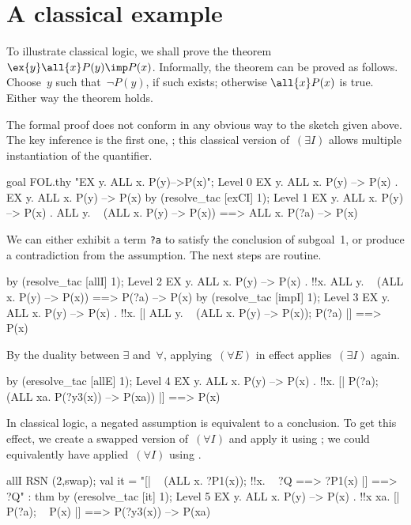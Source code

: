 \section{A classical example} \label{fol-cla-example}
To illustrate classical logic, we shall prove the theorem
$\ex{y}\all{x}P(y)\imp P(x)$.  Informally, the theorem can be proved as
follows.  Choose~$y$ such that~$\neg P(y)$, if such exists; otherwise
$\all{x}P(x)$ is true.  Either way the theorem holds.

The formal proof does not conform in any obvious way to the sketch given
above.  The key inference is the first one, ; this classical
version of~$(\exists I)$ allows multiple instantiation of the quantifier.
\begin{ttbox}
goal FOL.thy "EX y. ALL x. P(y)-->P(x)";
{\out Level 0}
{\out EX y. ALL x. P(y) --> P(x)}
{. EX y. ALL x. P(y) --> P(x)}
\ttbreak
by (resolve_tac [exCI] 1);
{\out Level 1}
{\out EX y. ALL x. P(y) --> P(x)}
{. ALL y. ~ (ALL x. P(y) --> P(x)) ==> ALL x. P(?a) --> P(x)}
\end{ttbox}
We can either exhibit a term {\tt?a} to satisfy the conclusion of
subgoal~1, or produce a contradiction from the assumption.  The next
steps are routine.
\begin{ttbox}
by (resolve_tac [allI] 1);
{\out Level 2}
{\out EX y. ALL x. P(y) --> P(x)}
{. !!x. ALL y. ~ (ALL x. P(y) --> P(x)) ==> P(?a) --> P(x)}
\ttbreak
by (resolve_tac [impI] 1);
{\out Level 3}
{\out EX y. ALL x. P(y) --> P(x)}
{. !!x. [| ALL y. ~ (ALL x. P(y) --> P(x)); P(?a) |] ==> P(x)}
\end{ttbox}
By the duality between $\exists$ and~$\forall$, applying~$(\forall E)$
in effect applies~$(\exists I)$ again.
\begin{ttbox}
by (eresolve_tac [allE] 1);
{\out Level 4}
{\out EX y. ALL x. P(y) --> P(x)}
{. !!x. [| P(?a); ~ (ALL xa. P(?y3(x)) --> P(xa)) |] ==> P(x)}
\end{ttbox}
In classical logic, a negated assumption is equivalent to a conclusion.  To
get this effect, we create a swapped version of~$(\forall I)$ and apply it
using ; we could equivalently have applied~$(\forall
I)$ using .
\begin{ttbox}
allI RSN (2,swap);
{\out val it = "[| ~ (ALL x. ?P1(x)); !!x. ~ ?Q ==> ?P1(x) |] ==> ?Q" : thm}
by (eresolve_tac [it] 1);
{\out Level 5}
{\out EX y. ALL x. P(y) --> P(x)}
{. !!x xa. [| P(?a); ~ P(x) |] ==> P(?y3(x)) --> P(xa)}
\end{ttbox}
